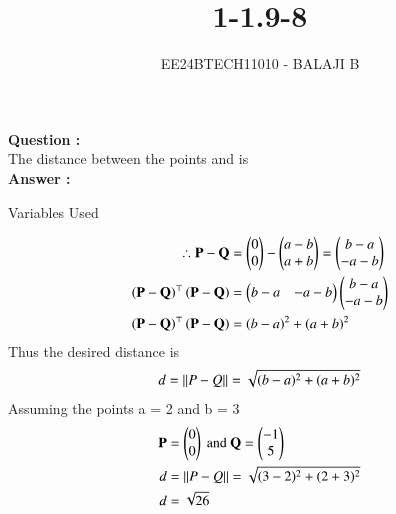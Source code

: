 \documentclass[journal]{IEEEtran}
\begin{document}

\vspace{3cm}

\title{1-1.9-8}
\author{EE24BTECH11010 - BALAJI B
}
{\let\newpage\relax\maketitle}

\renewcommand{\thefigure}{\theenumi}
\renewcommand{\thetable}{\theenumi}
\setlength{\intextsep}{10pt} %


\renewcommand{\thetable}{\theenumi}

\textbf{Question :} \\ 
The distance between the points  and  is   \\

\textbf{Answer :} \\

\begin{table}[h!]    
  \centering
  
  \caption{Variables Used}
  \label{tab1.9.19.1}
\end{table}
\begin{align}
    \therefore\mathbf{P} - \mathbf{Q} &= \begin{pmatrix}0 \\ 0 \end{pmatrix} - \begin{pmatrix}a - b \\ a + b\end{pmatrix} = \begin{pmatrix}b - a \\ -a -b\end{pmatrix} \\
    \left(\mathbf{P - Q}\right)^\top \left(\mathbf{P - Q}\right) &= \begin{pmatrix}b-a & -a-b\end{pmatrix}\begin{pmatrix}b-a \\ -a-b\end{pmatrix} \\
    \left(\mathbf{P - Q}\right)^\top \left(\mathbf{P - Q}\right) &= (b - a)^2 + (a + b)^2
\end{align} 
Thus the desired distance is 
\begin{align}
    d = \left\lVert P - Q\right\rVert = \sqrt{(b - a)^2 + (a + b)^2}
\end{align}
Assuming the points a = 2 and b = 3 
\begin{align}
    \mathbf{P} &= \begin{pmatrix}0 \\ 0\end{pmatrix} \text{ and }\mathbf{Q} = \begin{pmatrix}-1 \\ 5\end{pmatrix} \\
    d &= \left\lVert P - Q\right\rVert = \sqrt{(3 - 2)^2 + (2 + 3)^2}\\
    d &= \sqrt{26}
\end{align}
\end{document}
